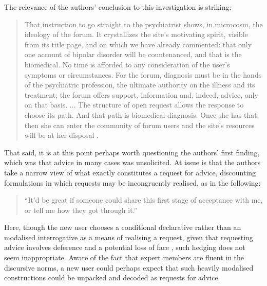 		 The relevance of the authors' conclusion to this investigation is striking:

			   \begin{quote}\small\singlespacing
			   That instruction to go straight to the psychiatrist shows, in microcosm, the ideology of the forum. It crystallizes the site's motivating spirit, visible from its title page, and on which we have already commented: that only one account of bipolar disorder will be countenanced, and that is the biomedical. No time is afforded to any consideration of the user's symptoms or circumstances. For the forum, diagnosis must be in the hands of the psychiatric profession, the ultimate authority on the illness and its treatment; the forum offers support, information and, indeed, advice, only on that basis. ... The structure of open request allows the response to choose its path. And that path is biomedical diagnosis. Once she has that, then she can enter the community of forum users and the site's resources will be at her disposal \citeyear[pp.~940--941]{vayreda_social_2009}.
			   \end{quote}

	\noindent That said, it is at this point perhaps worth questioning the authors' first finding, which was that advice in many cases was unsolicited. At issue is that the authors take a narrow view of what exactly constitutes a request for advice, discounting formulations in which requests may be incongruently realised, as in the following:

	  \begin{quote}\small\singlespacing
	  ``It'd be great if someone could share this first stage of acceptance with me, or tell me how they got through it.''
	   \end{quote} 

	  \noindent Here, though the new user chooses a conditional declarative rather than an modalised interrogative as a means of realising a request, given that requesting advice involves deference and a potential loss of face \cite{brown_politeness:_1987}, such hedging does not seem inappropriate. Aware of the fact that expert members are fluent in the discursive norms, a new user could perhaps expect that such heavily modalised constructions could be unpacked and decoded as requests for advice.




